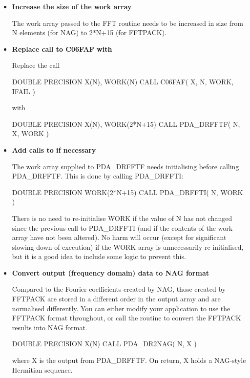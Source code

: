\documentclass[11pt,twoside,nolof]{starlink}
\begin{document}
\begin{itemize}

\item\textbf{Increase the size of the work array}

   The work array passed to the FFT routine needs to be increased in
   size from N elements (for NAG) to 2*N+15 (for FFTPACK).

\item\textbf{Replace call to C06FAF with
}

   Replace the call

\begin{terminalv}
      DOUBLE PRECISION X(N), WORK(N)
      CALL C06FAF( X, N, WORK, IFAIL )
\end{terminalv}

   with

\begin{terminalv}
      DOUBLE PRECISION X(N), WORK(2*N+15)
      CALL PDA_DRFFTF( N, X, WORK )
\end{terminalv}

\item{\bf\label{faf3}Add calls to
if necessary}

   The work array supplied to PDA\_DRFFTF needs initialising before calling
   PDA\_DRFFTF. This is done by calling PDA\_DRFFTI:

\begin{terminalv}
      DOUBLE PRECISION WORK(2*N+15)
      CALL PDA_DRFFTI( N, WORK )
\end{terminalv}

   There is no need to re-initialise WORK if the value of N has not
   changed since the previous call to PDA\_DRFFTI (and if the contents of the
   work array have not been altered). No harm will occur (except for
   significant slowing down of execution) if the WORK array is
   unnecessarily re-initialised, but it is a good idea to include some
   logic to prevent this.

\item\textbf{Convert output (frequency domain) data to NAG format}

   Compared to the Fourier coefficients created by NAG, those created
   by FFTPACK are stored in a different order in the output array and
   are normalised differently. You can either modify your application to
   use the FFTPACK format throughout, or call
   the
   routine to convert the FFTPACK results into NAG format.

\begin{terminalv}
      DOUBLE PRECISION X(N)
      CALL PDA_DR2NAG( N, X )
\end{terminalv}

   where X is the output from PDA\_DRFFTF. On return, X holds a NAG-style
   Hermitian sequence.

\end{itemize}
\end{document}
